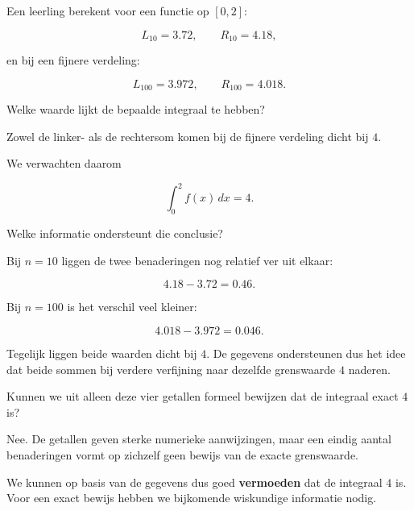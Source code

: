 \documentclass{ximera}
\begin{document}
\begin{oefening}{\oefG}

Een leerling berekent voor een functie op \([0,2]\):

\[
L_{10}=3.72,
\qquad
R_{10}=4.18,
\]

en bij een fijnere verdeling:

\[
L_{100}=3.972,
\qquad
R_{100}=4.018.
\]

\begin{question}
Welke waarde lijkt de bepaalde integraal te hebben?

\begin{oplossing}
Zowel de linker- als de rechtersom komen bij de fijnere verdeling dicht
bij \(4\).

We verwachten daarom

\[
\boxed{
\int_0^2f(x)\,dx=4
}.
\]
\end{oplossing}
\end{question}

\begin{question}
Welke informatie ondersteunt die conclusie?

\begin{oplossing}
Bij \(n=10\) liggen de twee benaderingen nog relatief ver uit elkaar:

\[
4.18-3.72=0.46.
\]

Bij \(n=100\) is het verschil veel kleiner:

\[
4.018-3.972=0.046.
\]

Tegelijk liggen beide waarden dicht bij \(4\). De gegevens ondersteunen
dus het idee dat beide sommen bij verdere verfijning naar dezelfde
grenswaarde \(4\) naderen.
\end{oplossing}
\end{question}

\begin{question}
Kunnen we uit alleen deze vier getallen formeel bewijzen dat de integraal
exact \(4\) is?

\begin{oplossing}
Nee. De getallen geven sterke numerieke aanwijzingen, maar een eindig
aantal benaderingen vormt op zichzelf geen bewijs van de exacte
grenswaarde.

We kunnen op basis van de gegevens dus goed \textbf{vermoeden} dat de
integraal \(4\) is. Voor een exact bewijs hebben we bijkomende
wiskundige informatie nodig.
\end{oplossing}
\end{question}

\end{oefening}
\end{document}
